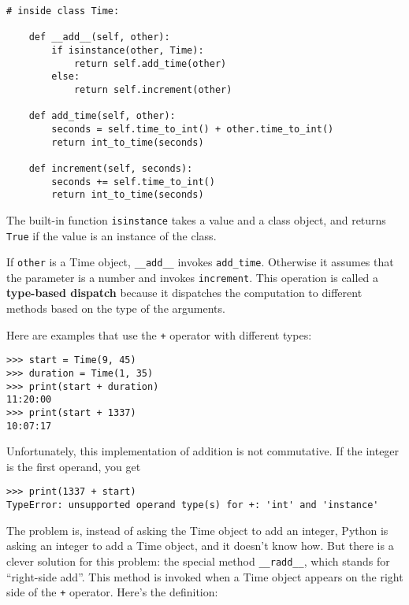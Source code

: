 \begin{lstlisting}
# inside class Time:

    def __add__(self, other):
        if isinstance(other, Time):
            return self.add_time(other)
        else:
            return self.increment(other)

    def add_time(self, other):
        seconds = self.time_to_int() + other.time_to_int()
        return int_to_time(seconds)

    def increment(self, seconds):
        seconds += self.time_to_int()
        return int_to_time(seconds)
\end{lstlisting}

%
The built-in function {\tt isinstance} takes a value and a
class object, and returns {\tt True} if the value is an instance
of the class.

If {\tt other} is a Time object, \verb"__add__" invokes
\verb"add_time".  Otherwise it assumes that the parameter
is a number and invokes {\tt increment}.  This operation is
called a {\bf type-based dispatch} because it dispatches the
computation to different methods based on the type of the
arguments.

Here are examples that use the {\tt +} operator with different
types:

\begin{lstlisting}
>>> start = Time(9, 45)
>>> duration = Time(1, 35)
>>> print(start + duration)
11:20:00
>>> print(start + 1337)
10:07:17
\end{lstlisting}

%
Unfortunately, this implementation of addition is not commutative.
If the integer is the first operand, you get

\begin{lstlisting}
>>> print(1337 + start)
TypeError: unsupported operand type(s) for +: 'int' and 'instance'
\end{lstlisting}

%
The problem is, instead of asking the Time object to add an integer,
Python is asking an integer to add a Time object, and it doesn't know
how.  But there is a clever solution for this problem: the
special method \verb"__radd__", which stands for ``right-side add''.
This method is invoked when a Time object appears on the right side of
the {\tt +} operator.  Here's the definition:

